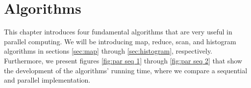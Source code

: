 \chapter{Algorithms}
\label{chap:algorithms}

This chapter introduces four fundamental algorithms that are very useful in parallel computing.
We will be introducing map, reduce, scan, and histogram algorithms in sections \ref{sec:map} through \ref{sec:histogram}, respectively.
Furthermore, we present figures \ref{fig:par seq 1} through \ref{fig:par seq 2} that show the development of the algorithms' running time, where we compare a sequential and parallel implementation.

%      
%      

%      
%      








